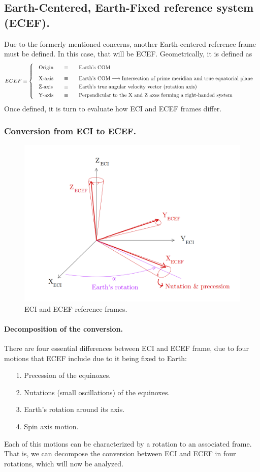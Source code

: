 	\subsection{Earth-Centered, Earth-Fixed reference system (ECEF).}
	\indent Due to the formerly mentioned concerns, another Earth-centered reference frame must be defined. In this case, that will be ECEF. Geometrically, it is defined as \cite{Tapley}
	\[
	\arraycolsep=10pt
	\def\arraystretch{1.3}
	ECEF \equiv\left\{
	\begin{array}{lll}
	\text{Origin} 	& \equiv 	& \text{Earth's COM} \\[0.5 em]
	\text{X-axis} 	& \equiv 	& \text{Earth's COM} \longrightarrow \text{Intersection of prime meridian and true equatorial plane} \\
	\text{Z-axis} 	& \equiv 	& \text{Earth's true angular velocity vector (rotation axis)} \\
	\text{Y-axis} 	& \equiv 	& \text{Perpendicular to the X and Z axes forming a right-handed system} \\
	\end{array}
	\right.
	\]
	\indent Once defined, it is turn to evaluate how ECI and ECEF frames differ.
		\subsubsection{Conversion from ECI to ECEF.}
		\begin{figure}[!htb]
		\centering\includegraphics[width = 0.6\linewidth]{Appendices/Appendix_B/ECI_ECEF}
		\caption{ECI and ECEF reference frames.}
		\label{fig: ECI_ECEF}
		\end{figure}
		\FloatBarrier
		\paragraph{Decomposition of the conversion. \\}
		\indent There are four essential differences between ECI and ECEF frame, due to four motions that ECEF include due to it being fixed to Earth:
		\begin{itemize}
		\item[1.] Precession of the equinoxes.
		\item[2.] Nutations (small oscillations) of the equinoxes.
		\item[3.] Earth's rotation around its axis.
		\item[4.] Spin axis motion.
		\end{itemize}
		\indent Each of this motions can be characterized by a rotation to an associated frame. That is, we can decompose the conversion between ECI and ECEF in four rotations, which will now be analyzed.
